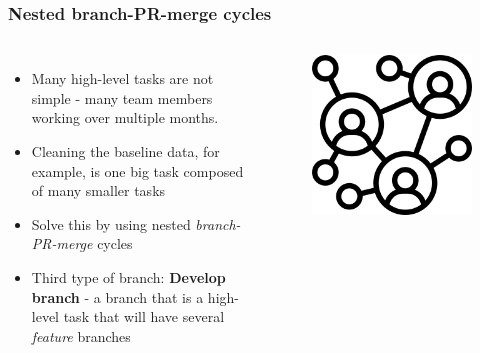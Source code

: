 \documentclass[aspectratio=169]{beamer}
\begin{document}
\begin{frame}
	\frametitle{Nested branch-PR-merge cycles}
	\begin{columns}[c]

		\begin{itemize}
			\setlength\itemsep{.5em}
			\item Many high-level tasks are not simple
			- many team members working over multiple months.
			\item Cleaning the baseline data,
			for example, is one big task composed of many smaller tasks
			\item Solve this by using nested \textit{branch-PR-merge} cycles
			\item Third type of branch: \textbf{Develop branch}
			- a branch that is a high-level task that
			will have several \textit{feature} branches
		\end{itemize}


		\begin{figure}
			\centering
			\includegraphics[width=.65\textwidth]{./img/team-challenge.png}
		\end{figure}
	\end{columns}
\end{frame}
\end{document}
